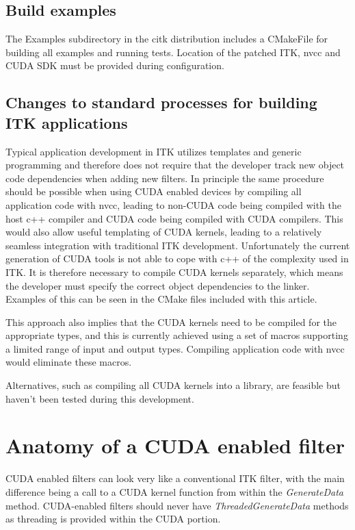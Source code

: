 \documentclass{InsightArticle}
\begin{document}
\subsection{Build examples}
The Examples subdirectory in the citk distribution includes a
CMakeFile for building all examples and running tests. Location of the
patched ITK, nvcc and CUDA SDK must be provided during configuration.

\subsection{Changes to standard processes for building ITK applications}
Typical application development in ITK utilizes templates and generic
programming and therefore does not require that the developer track
new object code dependencies when adding new filters. In principle the
same procedure should be possible when using CUDA enabled devices by
compiling all application code with nvcc, leading to non-CUDA code
being compiled with the host c++ compiler and CUDA code being compiled
with CUDA compilers. This would also allow useful templating of CUDA
kernels, leading to a relatively seamless integration with traditional
ITK development. Unfortunately the current generation of CUDA tools is
not able to cope with c++ of the complexity used in ITK. It is
therefore necessary to compile CUDA kernels separately, which means
the developer must specify the correct object dependencies to the
linker. Examples of this can be seen in the CMake files included with
this article.

This approach also implies that the CUDA kernels need to be compiled
for the appropriate types, and this is currently achieved using a set
of macros supporting a limited range of input and output
types. Compiling application code with nvcc would eliminate these
macros.

Alternatives, such as compiling all CUDA kernels into a library, are
feasible but haven't been tested during this development.



\section{Anatomy of a CUDA enabled filter}
CUDA enabled filters can look very like a conventional ITK filter,
with the main difference being a call to a CUDA kernel function from
within the {\em GenerateData} method. CUDA-enabled filters should
never have {\em ThreadedGenerateData} methods as threading is provided
within the CUDA portion.
\end{document}
